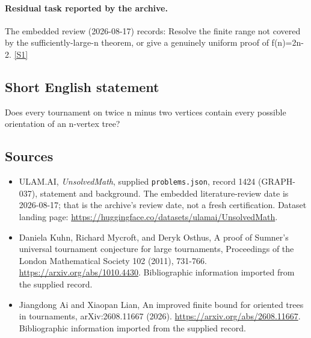 \documentclass[11pt,a4paper]{article}
\newcommand{\sref}[2]{\hyperlink{source:#1:#2}{[S#2]}}
\begin{document}
\paragraph{Residual task reported by the archive.}

The embedded review (2026-08-17) records: Resolve the finite range not covered by the sufficiently-large-n theorem, or give a genuinely uniform proof of f(n)=2n-2. \sref{1424}{1}

\subsection{Short English statement}

Does every tournament on twice n minus two vertices contain every possible orientation of an n-vertex tree?

\subsection{Sources}

{\small

\begin{itemize}

\item[\hypertarget{source:1424:1}{S1}] ULAM.AI, \emph{UnsolvedMath}, supplied \texttt{problems.json}, record 1424 (GRAPH-037), statement and background. The embedded literature-review date is 2026-08-17; that is the archive’s review date, not a fresh certification. Dataset landing page: \url{https://huggingface.co/datasets/ulamai/UnsolvedMath}.

\item[\hypertarget{source:1424:2}{S2}] Daniela Kuhn, Richard Mycroft, and Deryk Osthus, A proof of Sumner's universal tournament conjecture for large tournaments, Proceedings of the London Mathematical Society 102 (2011), 731-766. \url{https://arxiv.org/abs/1010.4430}. Bibliographic information imported from the supplied record.

\item[\hypertarget{source:1424:3}{S3}] Jiangdong Ai and Xiaopan Lian, An improved finite bound for oriented trees in tournaments, arXiv:2608.11667 (2026). \url{https://arxiv.org/abs/2608.11667}. Bibliographic information imported from the supplied record.

\end{itemize}

}

\label{end:1424}
\end{document}
